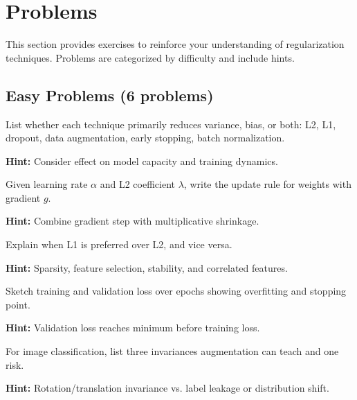 
\section{Problems }
\label{sec:ch7-problems}

This section provides exercises to reinforce your understanding of regularization techniques. Problems are categorized by difficulty and include hints.

\subsection{Easy Problems (6 problems)}

\begin{problem}
List whether each technique primarily reduces variance, bias, or both: L2, L1, dropout, data augmentation, early stopping, batch normalization.

\textbf{Hint:} Consider effect on model capacity and training dynamics.
\end{problem}

\begin{problem}
Given learning rate $\alpha$ and L2 coefficient $\lambda$, write the update rule for weights with gradient $g$.

\textbf{Hint:} Combine gradient step with multiplicative shrinkage.
\end{problem}

\begin{problem}[L1 vs L2]
Explain when L1 is preferred over L2, and vice versa.

\textbf{Hint:} Sparsity, feature selection, stability, and correlated features.
\end{problem}

\begin{problem}
Sketch training and validation loss over epochs showing overfitting and stopping point.

\textbf{Hint:} Validation loss reaches minimum before training loss.
\end{problem}

\begin{problem}
For image classification, list three invariances augmentation can teach and one risk.

\textbf{Hint:} Rotation/translation invariance vs. label leakage or distribution shift.
\end{problem}

